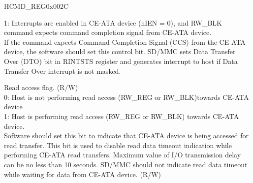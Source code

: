 \begin{register}{H}{CMD\_REG}{0x002C}
\begin{regdesc}
\begin{reglist}
1: Interrupts are enabled in CE-ATA device (nIEN = 0), and RW\_BLK command expects command completion signal from CE-ATA device.\\
If the command expects Command Completion Signal (CCS) from the CE-ATA device, the software should set this control bit. SD/MMC sets Data Transfer Over (DTO) bit in RINTSTS register and generates interrupt to host if Data Transfer Over interrupt is not masked.
\item [READ\_CEATA\_DEVICE] Read access flag. (R/W)\\
0: Host is not performing read access (RW\_REG or RW\_BLK)towards CE-ATA device\\
1: Host is performing read access (RW\_REG or RW\_BLK) towards CE-ATA device.\\
Software should set this bit to indicate that CE-ATA device is being accessed for read transfer. This bit is used to disable read data timeout indication while performing CE-ATA read transfers. Maximum value of I/O transmission delay can be no less than 10 seconds. SD/MMC should not indicate read data timeout while waiting for data from CE-ATA device. (R/W)
\item [Continued on the next page...]
\end{reglist}\end{regdesc}
\end{register}
\addtocounter{Regfloat}{-1}
